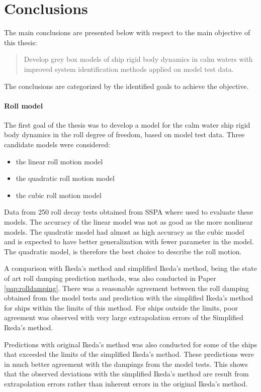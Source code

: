 \chapter{Conclusions\label{ch:conclusions}}
The main conclusions are presented below with respect to the main objective of this thesis:
\begin{quote} 
Develop grey box models of ship rigid body dynamics in calm waters with improved system identification methods applied on model test data.
\end{quote}
\noindent The conclusions are categorized by the identified goals to achieve the objective.

\subsubsection*{Roll model}
The first goal of the thesis was to develop a model for the calm water ship rigid body dynamics in the roll degree of freedom, based on model test data. 
Three candidate models were considered: 
\begin{itemize}
    \item the linear roll motion model
    \item the quadratic roll motion model
    \item the cubic roll motion model
\end{itemize}
\noindent Data from 250 roll decay tests obtained from SSPA where used to evaluate these models. The accuracy of the linear model was not as good as the more nonlinear models. The quadratic model had almost as high accuracy as the cubic model and is expected to have better generalization with fewer parameter in the model. The quadratic model, is therefore the best choice to describe the roll motion. 

A comparison with Ikeda's method and simplified Ikeda's method, being the state of art roll damping prediction methods, was also conducted in Paper \ref{pap:rolldamping}. There was a reasonable agreement between the roll damping obtained from the model tests and prediction with the simplified Ikeda's method for ships within the limits of this method. For ships outside the limits, poor agreement was observed with very large extrapolation errors of the Simplified Ikeda's method. 

Predictions with original Ikeda's method was also conducted for some of the ships that exceeded the limits of the simplified Ikeda's method. These predictions were in much better agreement with the dampings from the model tests. This shows that the observed deviations with the simplified Ikeda's method are result from extrapolation errors rather than inherent 
errors in the original Ikeda's method.

